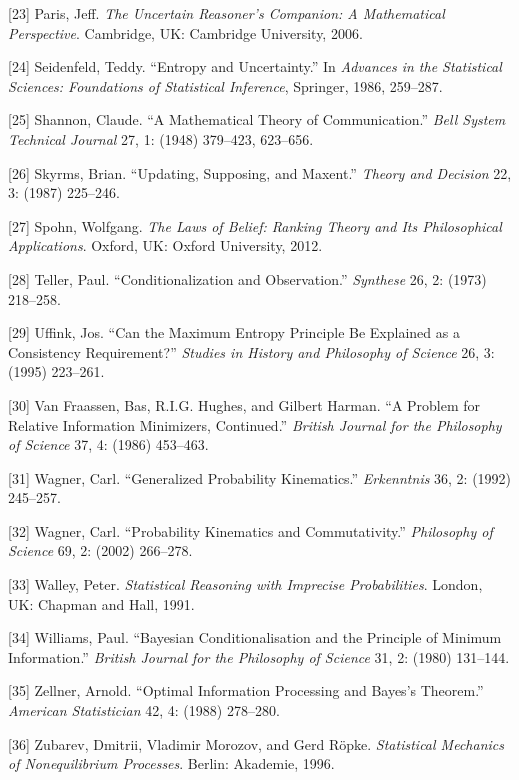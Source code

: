 \documentclass[entropy,article,submit,oneauthor,pdftex,12pt,a4paper]{mdpi}
\begin{document}
[23] Paris, Jeff. \emph{The Uncertain Reasoner's Companion: A Mathematical Perspective}. Cambridge, UK: Cambridge University, 2006.

[24] Seidenfeld, Teddy. ``Entropy and Uncertainty.'' In \emph{Advances in the Statistical Sciences: Foundations of Statistical Inference}, Springer, 1986, 259--287.

[25] Shannon, Claude. ``A Mathematical Theory of Communication.'' \emph{Bell System Technical Journal} 27, 1: (1948) 379--423, 623--656.

[26] Skyrms, Brian. ``Updating, Supposing, and Maxent.'' \emph{Theory and Decision} 22, 3: (1987) 225--246.

[27] Spohn, Wolfgang. \emph{The Laws of Belief: Ranking Theory and Its Philosophical Applications}. Oxford, UK: Oxford University, 2012.

[28] Teller, Paul. ``Conditionalization and Observation.'' \emph{Synthese} 26, 2: (1973) 218--258.

[29] Uffink, Jos. ``Can the Maximum Entropy Principle Be Explained as a Consistency Requirement?'' \emph{Studies in History and Philosophy of Science} 26, 3: (1995) 223--261.

[30] Van Fraassen, Bas, R.I.G. Hughes, and Gilbert Harman. ``A Problem for Relative Information Minimizers, Continued.'' \emph{British Journal for the Philosophy of Science} 37, 4: (1986) 453--463.

[31] Wagner, Carl. ``Generalized Probability Kinematics.'' \emph{Erkenntnis} 36, 2: (1992) 245--257.

[32] Wagner, Carl. ``Probability Kinematics and Commutativity.'' \emph{Philosophy of Science} 69, 2: (2002) 266--278.

[33] Walley, Peter. \emph{Statistical Reasoning with Imprecise Probabilities}. London, UK: Chapman and Hall, 1991.

[34] Williams, Paul. ``Bayesian Conditionalisation and the Principle of Minimum Information.'' \emph{British Journal for the Philosophy of Science} 31, 2: (1980) 131--144.

[35] Zellner, Arnold. ``Optimal Information Processing and Bayes's Theorem.'' \emph{American Statistician} 42, 4: (1988) 278--280.

[36] Zubarev, Dmitrii, Vladimir Morozov, and Gerd R{\"o}pke. \emph{Statistical Mechanics of Nonequilibrium Processes}. Berlin: Akademie, 1996.


\end{document}
